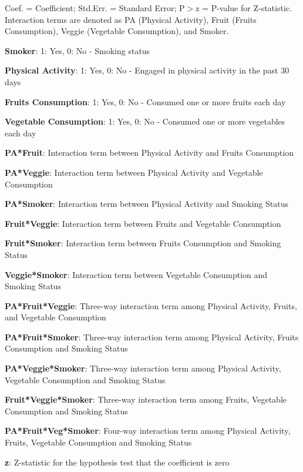 \documentclass[11pt]{article}
\begin{document}
\begin{table}[h]
\begin{threeparttable}
{\begin{tabular}{lrrrlrr}
\bottomrule
\end{tabular}}
\begin{tablenotes}
\footnotesize
\item Coef. = Coefficient; Std.Err. = Standard Error; P$>$\textbar{}z\textbar{} = P-value for Z-statistic. Interaction terms are denoted as PA (Physical Activity), Fruit (Fruits Consumption), Veggie (Vegetable Consumption), and Smoker.
\item \textbf{Smoker}: 1: Yes, 0: No - Smoking status
\item \textbf{Physical Activity}: 1: Yes, 0: No - Engaged in physical activity in the past 30 days
\item \textbf{Fruits Consumption}: 1: Yes, 0: No - Consumed one or more fruits each day
\item \textbf{Vegetable Consumption}: 1: Yes, 0: No - Consumed one or more vegetables each day
\item \textbf{PA*Fruit}: Interaction term between Physical Activity and Fruits Consumption
\item \textbf{PA*Veggie}: Interaction term between Physical Activity and Vegetable Consumption
\item \textbf{PA*Smoker}: Interaction term between Physical Activity and Smoking Status
\item \textbf{Fruit*Veggie}: Interaction term between Fruits and Vegetable Consumption
\item \textbf{Fruit*Smoker}: Interaction term between Fruits Consumption and Smoking Status
\item \textbf{Veggie*Smoker}: Interaction term between Vegetable Consumption and Smoking Status
\item \textbf{PA*Fruit*Veggie}: Three-way interaction term among Physical Activity, Fruits, and Vegetable Consumption
\item \textbf{PA*Fruit*Smoker}: Three-way interaction term among Physical Activity, Fruits Consumption and Smoking Status
\item \textbf{PA*Veggie*Smoker}: Three-way interaction term among Physical Activity, Vegetable Consumption and Smoking Status
\item \textbf{Fruit*Veggie*Smoker}: Three-way interaction term among Fruits, Vegetable Consumption and Smoking Status
\item \textbf{PA*Fruit*Veg*Smoker}: Four-way interaction term among Physical Activity, Fruits, Vegetable Consumption and Smoking Status
\item \textbf{z}: Z-statistic for the hypothesis test that the coefficient is zero
\end{tablenotes}
\end{threeparttable}
\end{table}
\end{document}
